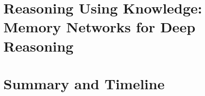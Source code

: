 \documentclass[12pt]{cmuthesis}
\begin{document}
\chapter{Reasoning Using Knowledge: Memory Networks for Deep Reasoning}
\label{chapter:memnet_qa}

\chapter{Summary and Timeline}


%

\backmatter


\renewcommand{\bibsection}{\chapter{\bibname}}

\end{document}
